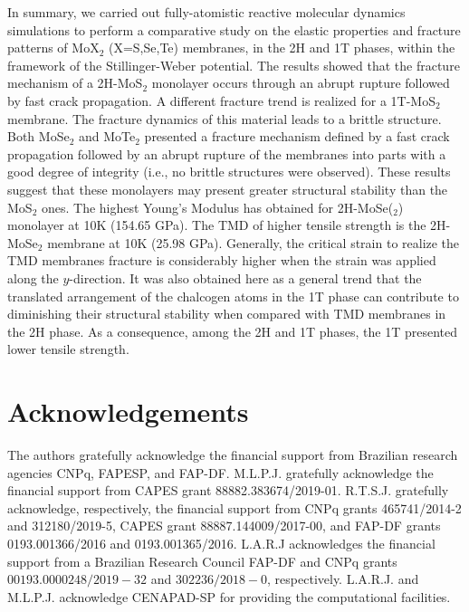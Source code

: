 \documentclass[a4paper,fleqn]{cas-sc}
\begin{document}
In summary, we carried out fully-atomistic reactive molecular dynamics simulations to perform a comparative study on the elastic properties and fracture patterns of MoX$_{2}$ (X=S,Se,Te) membranes, in the 2H and 1T phases, within the framework of the Stillinger-Weber potential. The results showed that the fracture mechanism of a 2H-MoS$_2$ monolayer occurs through an abrupt rupture followed by fast crack propagation. A different fracture trend is realized for a 1T-MoS$_2$ membrane. The fracture dynamics of this material leads to a brittle structure. Both MoSe$_{2}$ and MoTe$_{2}$ presented a fracture mechanism defined by a fast crack propagation followed by an abrupt rupture of the membranes into parts with a good degree of integrity (i.e., no brittle structures were observed). These results suggest that these monolayers may present greater structural stability than the MoS$_2$ ones. The highest Young's Modulus has obtained for 2H-MoSe($_2$) monolayer at 10K (154.65 GPa). The TMD of higher tensile strength is the 2H-MoSe$_{2}$ membrane at 10K (25.98 GPa). Generally, the critical strain to realize the TMD membranes fracture is considerably higher when the strain was applied along the $y$-direction. It was also obtained here as a general trend that the translated arrangement of the chalcogen atoms in the 1T phase can contribute to diminishing their structural stability when compared with TMD membranes in the 2H phase. As a consequence, among the 2H and 1T phases, the 1T presented lower tensile strength. 

\section*{Acknowledgements}
The authors gratefully acknowledge the financial support from Brazilian research agencies CNPq, FAPESP, and FAP-DF.  M.L.P.J. gratefully acknowledge the financial support from CAPES grant 88882.383674/2019-01. R.T.S.J. gratefully acknowledge, respectively, the financial support from CNPq grants 465741/2014-2 and 312180/2019-5, CAPES grant 88887.144009/2017-00, and FAP-DF grants 0193.001366/2016 and 0193.001365/2016. L.A.R.J acknowledges the financial support from a Brazilian Research Council FAP-DF and CNPq grants $00193.0000248/2019-32$ and $302236/2018-0$, respectively. L.A.R.J. and M.L.P.J. acknowledge CENAPAD-SP for providing the computational facilities.

\printcredits




\end{document}
